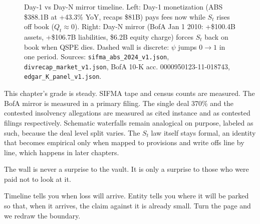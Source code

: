 \begin{figure}[h]
\centering
{}
\caption{Day-1 vs Day-N mirror timeline. Left: Day-1 monetization (ABS \$388.1B at +43.3\% YoY, recaps \$81B) pays fees now while $S_t$ rises off book ($Q_t \approx 0$). Right: Day-N mirror (BofA Jan 1 2010: +\$100.4B assets, +\$106.7B liabilities, \$6.2B equity charge) forces $S_t$ back on book when QSPE dies. Dashed wall is discrete: $\psi$ jumps $0 \to 1$ in one period. Sources: \texttt{sifma\_abs\_2024\_v1.json}, \texttt{divrecap\_market\_v1.json}, BofA 10-K acc. 0000950123-11-018743, \texttt{edgar\_K\_panel\_v1.json}.}
\label{fig:timeline-mirror}
\end{figure}

This chapter's grade is steady. SIFMA tape and census counts are measured. The BofA mirror is measured in a primary filing. The single deal 370\% and the contested insolvency allegations are measured as cited instance and as contested filings respectively. Schematic waterfalls remain analogical on purpose, labeled as such, because the deal level split varies. The $S_t$ law itself stays formal, an identity that becomes empirical only when mapped to provisions and write offs line by line, which happens in later chapters.

The wall is never a surprise to the vault. It is only a surprise to those who were paid not to look at it.

Timeline tells you when loss will arrive. Entity tells you where it will be parked so that, when it arrives, the claim against it is already small. Turn the page and we redraw the boundary.

